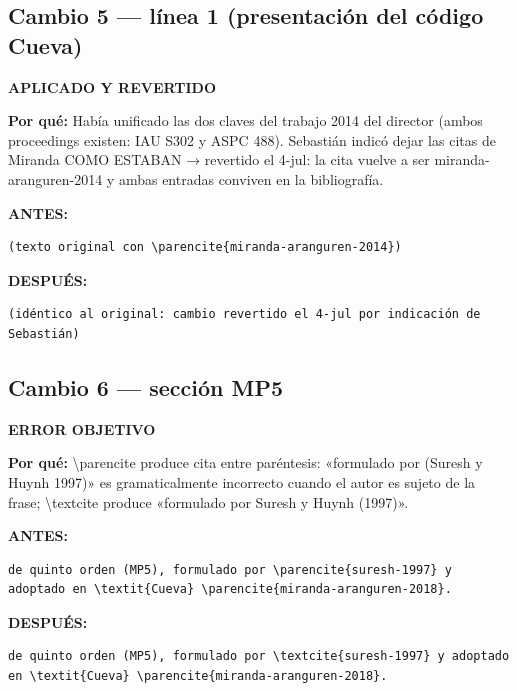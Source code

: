 \documentclass[11pt,a4paper]{article}
\begin{document}
\subsection*{Cambio 5 --- línea 1 (presentación del código Cueva)}
\colorbox{revbg}{\textbf{\footnotesize APLICADO Y REVERTIDO}}

\textbf{Por qué:} Había unificado las dos claves del trabajo 2014 del director (ambos proceedings existen: IAU S302 y ASPC 488). Sebastián indicó dejar las citas de Miranda COMO ESTABAN → revertido el 4-jul: la cita vuelve a ser miranda-aranguren-2014 y ambas entradas conviven en la bibliografía.

\textcolor{antesline}{\textbf{ANTES:}}
\begin{Verbatim}[breaklines=true, breakanywhere=true, fontsize=\small, frame=leftline, rulecolor=\color{antesline}, framerule=1.2pt]
(texto original con \parencite{miranda-aranguren-2014})
\end{Verbatim}
\textcolor{despline}{\textbf{DESPUÉS:}}
\begin{Verbatim}[breaklines=true, breakanywhere=true, fontsize=\small, frame=leftline, rulecolor=\color{despline}, framerule=1.2pt]
(idéntico al original: cambio revertido el 4-jul por indicación de Sebastián)
\end{Verbatim}

\subsection*{Cambio 6 --- sección MP5}
\colorbox{okbg}{\textbf{\footnotesize ERROR OBJETIVO}}

\textbf{Por qué:} \textbackslash{}parencite produce cita entre paréntesis: «formulado por (Suresh y Huynh 1997)» es gramaticalmente incorrecto cuando el autor es sujeto de la frase; \textbackslash{}textcite produce «formulado por Suresh y Huynh (1997)».

\textcolor{antesline}{\textbf{ANTES:}}
\begin{Verbatim}[breaklines=true, breakanywhere=true, fontsize=\small, frame=leftline, rulecolor=\color{antesline}, framerule=1.2pt]
de quinto orden (MP5), formulado por \parencite{suresh-1997} y adoptado en \textit{Cueva} \parencite{miranda-aranguren-2018}.
\end{Verbatim}
\textcolor{despline}{\textbf{DESPUÉS:}}
\begin{Verbatim}[breaklines=true, breakanywhere=true, fontsize=\small, frame=leftline, rulecolor=\color{despline}, framerule=1.2pt]
de quinto orden (MP5), formulado por \textcite{suresh-1997} y adoptado en \textit{Cueva} \parencite{miranda-aranguren-2018}.
\end{Verbatim}
\end{document}
